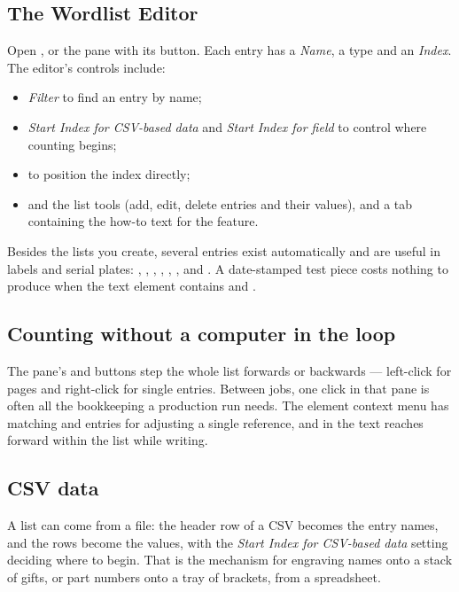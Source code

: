 \subsection*{The Wordlist Editor}

Open , or the  pane with its
 button. Each entry has a \emph{Name}, a type and an \emph{Index}. The
editor's controls include:

\begin{itemize}
  \item \emph{Filter} to find an entry by name;
  \item \emph{Start Index for CSV-based data} and \emph{Start Index for field} to
        control where counting begins;
  \item {} to position the index directly;
  \item {} and the list tools (add, edit, delete entries and their
        values), and a tab containing the how-to text for the feature.
\end{itemize}

\noindent Besides the lists you create, several entries exist automatically and
are useful in labels and serial plates: , , ,
, , ,  and
. A date-stamped test piece costs nothing to produce when the text
element contains  and .

\subsection*{Counting without a computer in the loop}

The  pane's  and  buttons step the whole
list forwards or backwards --- left-click for pages and right-click for single
entries. Between jobs, one click in that pane is often all the bookkeeping a
production run needs. The element context menu has matching
 and  entries
for adjusting a single reference, and  in the text reaches
forward within the list while writing.

\subsection*{CSV data}

A list can come from a file: the header row of a CSV becomes the entry names, and
the rows become the values, with the \emph{Start Index for CSV-based data} setting
deciding where to begin. That is the mechanism for engraving names onto a stack of
gifts, or part numbers onto a tray of brackets, from a spreadsheet.

